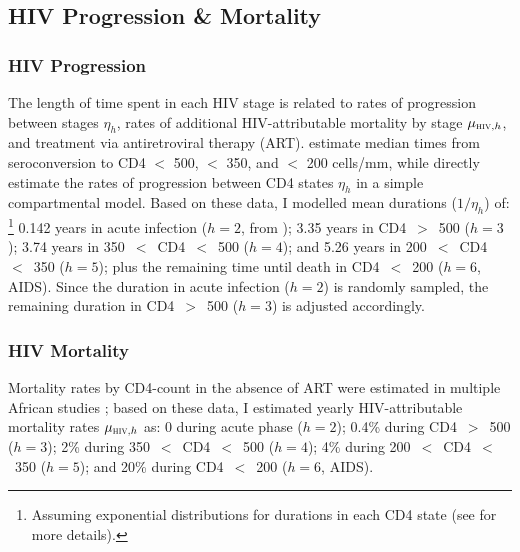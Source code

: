 \subsection{HIV Progression \& Mortality}\label{model.par.hiv}
\subsubsection{HIV Progression}\label{model.par.hiv.dur}
The length of time spent in each HIV stage is related to
rates of progression between stages $\eta_{h}$,
rates of additional HIV-attributable mortality by stage $\mu_{\textsc{hiv},h}$,
and treatment via antiretroviral therapy (ART).
\citet{Lodi2011} estimate median times from seroconversion to
CD4 $<$ 500, $<$ 350, and $<$ 200 cells/mm, while
\citet{Mangal2017} directly estimate the rates of progression between CD4 states $\eta_{h}$
in a simple compartmental model.
Based on these data, I modelled mean durations ($1/\eta_{h}$) of:%
\footnote{Assuming exponential distributions for durations in each CD4 state
  (see  for more details).}
0.142 years in acute infection ($h=2$, from );
3.35 years in CD4~$>$~500 ($h=3$);
3.74 years in 350~$<$~CD4~$<$~500 ($h=4$); and
5.26 years in 200~$<$~CD4~$<$~350 ($h=5$); plus
the remaining time until death in CD4~$<$~200 ($h=6$, AIDS).
Since the duration in acute infection ($h=2$) is randomly sampled,
the remaining duration in CD4~$>$~500 ($h=3$) is adjusted accordingly.
\subsubsection{HIV Mortality}\label{model.par.hiv.mort}
Mortality rates by CD4-count in the absence of ART were estimated in
multiple African studies \cite{Badri2006,Anglaret2012,Mangal2017};
based on these data, I estimated yearly HIV-attributable mortality rates $\mu_{\textsc{hiv},h}$ as:
0 during acute phase ($h=2$);
0.4\% during CD4~$>$~500 ($h=3$);
2\% during 350~$<$~CD4~$<$~500 ($h=4$);
4\% during 200~$<$~CD4~$<$~350 ($h=5$); and 
20\% during CD4~$<$~200 ($h=6$, AIDS).
